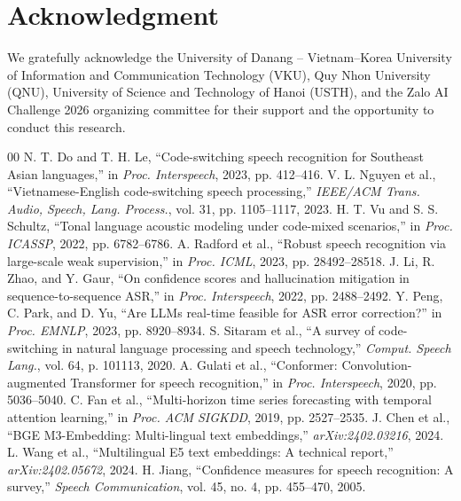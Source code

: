 \documentclass[9pt, conference, a4paper, compsocconf]{IEEEtran}
\begin{document}
\section*{Acknowledgment}
We gratefully acknowledge the University of Danang -- Vietnam–Korea University of Information and Communication Technology (VKU), Quy Nhon University (QNU), University of Science and Technology of Hanoi (USTH), and the Zalo AI Challenge 2026 organizing committee for their support and the opportunity to conduct this research.

\begin{thebibliography}{00}
 N. T. Do and T. H. Le, ``Code-switching speech recognition for Southeast Asian languages,'' in \textit{Proc. Interspeech}, 2023, pp. 412--416.
 V. L. Nguyen et al., ``Vietnamese-English code-switching speech processing,'' \textit{IEEE/ACM Trans. Audio, Speech, Lang. Process.}, vol. 31, pp. 1105--1117, 2023.
 H. T. Vu and S. S. Schultz, ``Tonal language acoustic modeling under code-mixed scenarios,'' in \textit{Proc. ICASSP}, 2022, pp. 6782--6786.
 A. Radford et al., ``Robust speech recognition via large-scale weak supervision,'' in \textit{Proc. ICML}, 2023, pp. 28492--28518.
 J. Li, R. Zhao, and Y. Gaur, ``On confidence scores and hallucination mitigation in sequence-to-sequence ASR,'' in \textit{Proc. Interspeech}, 2022, pp. 2488--2492.
 Y. Peng, C. Park, and D. Yu, ``Are LLMs real-time feasible for ASR error correction?'' in \textit{Proc. EMNLP}, 2023, pp. 8920--8934.
 S. Sitaram et al., ``A survey of code-switching in natural language processing and speech technology,'' \textit{Comput. Speech Lang.}, vol. 64, p. 101113, 2020.
 A. Gulati et al., ``Conformer: Convolution-augmented Transformer for speech recognition,'' in \textit{Proc. Interspeech}, 2020, pp. 5036--5040.
 C. Fan et al., ``Multi-horizon time series forecasting with temporal attention learning,'' in \textit{Proc. ACM SIGKDD}, 2019, pp. 2527--2535.
 J. Chen et al., ``BGE M3-Embedding: Multi-lingual text embeddings,'' \textit{arXiv:2402.03216}, 2024.
 L. Wang et al., ``Multilingual E5 text embeddings: A technical report,'' \textit{arXiv:2402.05672}, 2024.
 H. Jiang, ``Confidence measures for speech recognition: A survey,'' \textit{Speech Communication}, vol. 45, no. 4, pp. 455--470, 2005.

\end{thebibliography}
\end{document}
